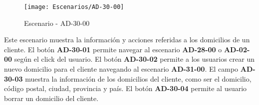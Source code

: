\begin{figure}[H]
\centering
\texttt{[image: Escenarios/AD-30-00]}
\caption{Escenario - AD-30-00}
\label{fig:AD-30-00}
\end{figure}
Este escenario muestra la información y acciones referidas a los domicilios de un cliente. 
El botón \textbf{AD-30-01} permite navegar al escenario \textbf{AD-28-00} o \textbf{AD-02-00} según el click del usuario.
El botón \textbf{AD-30-02} permite a los usuarios crear un nuevo domicilio para el cliente navegando al escenario \textbf{AD-31-00}.
El campo \textbf{AD-30-03} muestra la información de los domicilios del cliente, como ser el domicilio, código postal, ciudad, provincia y país. El botón \textbf{AD-30-04} permite al usuario borrar un domicilio del cliente.
\\